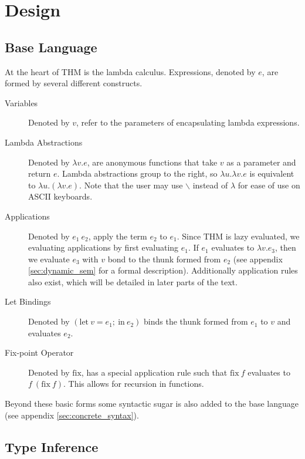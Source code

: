 \documentclass[12pt]{article}
\newcommand{\thmlet}[2]{\mathrm{let}~#1~\mathrm{in}~#2}
\newcommand{\thmfix}{\mathrm{fix}}
\begin{document}
\section{Design}

\subsection{Base Language}

At the heart of THM is the lambda calculus.
Expressions, denoted by $e$, are formed by several different
constructs.
\begin{description}
\item[Variables] Denoted by $v$, refer to the parameters of
  encapsulating lambda expressions.

\item[Lambda Abstractions] Denoted by $\lambda v. e$, are anonymous
  functions that take $v$ as a parameter and return $e$.
  Lambda abstractions group to the right, so $\lambda u. \lambda v. e$
  is equivalent to $\lambda u. (\lambda v. e)$.
  Note that the user may use $\backslash$ instead of $\lambda$ for
  ease of use on ASCII keyboards.

\item[Applications] Denoted by $e_1~e_2$, apply the term $e_2$ to
  $e_1$.
  Since THM is lazy evaluated, we evaluating applications by first
  evaluating $e_1$.
  If $e_1$ evaluates to $\lambda v. e_3$, then we evaluate $e_3$ with
  $v$ bond to the thunk formed from $e_2$ (see appendix
  \ref{sec:dynamic_sem} for a formal description).
  Additionally application rules also exist, which will be detailed
  in later parts of the text.

\item[Let Bindings] Denoted by $(\thmlet{v = e_1;}{e_2})$ binds the
  thunk formed from $e_1$ to $v$ and evaluates $e_2$.

\item[Fix-point Operator] Denoted by $\thmfix$, has a special
  application rule such that $\thmfix~f$ evaluates to $f~(\thmfix~f)$.
  This allows for recursion in functions.
\end{description}
Beyond these basic forms some syntactic sugar is also added to the
base language (see appendix \ref{sec:concrete_syntax}).


\subsection{Type Inference}
\end{document}
